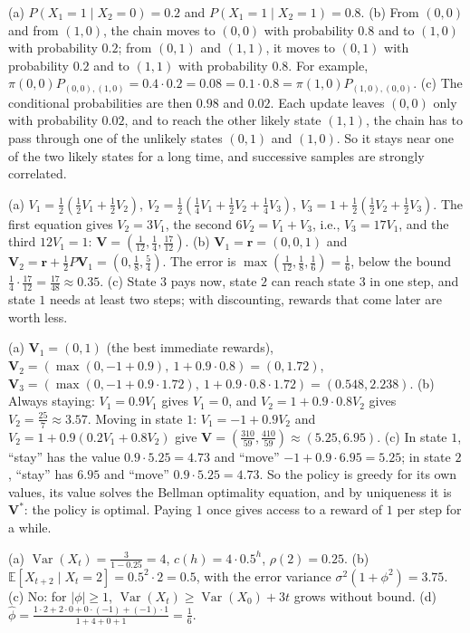 \documentclass[11pt]{article}
\newcommand{\E}{\mathbb{E}}
\DeclareMathOperator{\Var}{Var}
\begin{document}
\begin{description}[leftmargin=0pt, itemsep=0.3em]
    \item[\ref{pr:gibbs-practice}.] (a) $P(X_1 = 1 \mid X_2 = 0) = 0.2$ and $P(X_1 = 1 \mid X_2 = 1) = 0.8$. (b) From $(0, 0)$ and from $(1, 0)$, the chain moves to $(0, 0)$ with probability $0.8$ and to $(1, 0)$ with probability $0.2$; from $(0, 1)$ and $(1, 1)$, it moves to $(0, 1)$ with probability $0.2$ and to $(1, 1)$ with probability $0.8$. For example, $\pi(0, 0)P_{(0,0),(1,0)} = 0.4 \cdot 0.2 = 0.08 = 0.1 \cdot 0.8 = \pi(1, 0)P_{(1,0),(0,0)}$. (c) The conditional probabilities are then $0.98$ and $0.02$. Each update leaves $(0, 0)$ only with probability $0.02$, and to reach the other likely state $(1, 1)$, the chain has to pass through one of the unlikely states $(0, 1)$ and $(1, 0)$. So it stays near one of the two likely states for a long time, and successive samples are strongly correlated.
    \item[\ref{pr:bellman-practice}.] (a) $V_1 = \frac{1}{2}(\frac{1}{2}V_1 + \frac{1}{2}V_2)$, $V_2 = \frac{1}{2}(\frac{1}{4}V_1 + \frac{1}{2}V_2 + \frac{1}{4}V_3)$, $V_3 = 1 + \frac{1}{2}(\frac{1}{2}V_2 + \frac{1}{2}V_3)$. The first equation gives $V_2 = 3V_1$, the second $6V_2 = V_1 + V_3$, i.e., $V_3 = 17V_1$, and the third $12V_1 = 1$: $\mathbf{V} = (\frac{1}{12}, \frac{1}{4}, \frac{17}{12})$. (b) $\mathbf{V}_1 = \mathbf{r} = (0, 0, 1)$ and $\mathbf{V}_2 = \mathbf{r} + \frac{1}{2}P\mathbf{V}_1 = (0, \frac{1}{8}, \frac{5}{4})$. The error is $\max(\frac{1}{12}, \frac{1}{8}, \frac{1}{6}) = \frac{1}{6}$, below the bound $\frac{1}{4} \cdot \frac{17}{12} = \frac{17}{48} \approx 0.35$. (c) State $3$ pays now, state $2$ can reach state $3$ in one step, and state $1$ needs at least two steps; with discounting, rewards that come later are worth less.
    \item[\ref{pr:mdp-practice}.] (a) $\mathbf{V}_1 = (0, 1)$ (the best immediate rewards), $\mathbf{V}_2 = (\max(0, -1 + 0.9), \ 1 + 0.9 \cdot 0.8) = (0, 1.72)$, $\mathbf{V}_3 = (\max(0, -1 + 0.9 \cdot 1.72), \ 1 + 0.9 \cdot 0.8 \cdot 1.72) = (0.548, 2.238)$. (b) Always staying: $V_1 = 0.9V_1$ gives $V_1 = 0$, and $V_2 = 1 + 0.9 \cdot 0.8V_2$ gives $V_2 = \frac{25}{7} \approx 3.57$. Moving in state $1$: $V_1 = -1 + 0.9V_2$ and $V_2 = 1 + 0.9(0.2V_1 + 0.8V_2)$ give $\mathbf{V} = (\frac{310}{59}, \frac{410}{59}) \approx (5.25, 6.95)$. (c) In state $1$, ``stay'' has the value $0.9 \cdot 5.25 = 4.73$ and ``move'' $-1 + 0.9 \cdot 6.95 = 5.25$; in state $2$, ``stay'' has $6.95$ and ``move'' $0.9 \cdot 5.25 = 4.73$. So the policy is greedy for its own values, its value solves the Bellman optimality equation, and by uniqueness it is $\mathbf{V}^*$: the policy is optimal. Paying $1$ once gives access to a reward of $1$ per step for a while.
    \item[\ref{pr:ar1-practice}.] (a) $\Var(X_t) = \frac{3}{1 - 0.25} = 4$, $c(h) = 4 \cdot 0.5^h$, $\rho(2) = 0.25$. (b) $\E[X_{t+2} \mid X_t = 2] = 0.5^2 \cdot 2 = 0.5$, with the error variance $\sigma^2(1 + \phi^2) = 3.75$. (c) No: for $|\phi| \geq 1$, $\Var(X_t) \geq \Var(X_0) + 3t$ grows without bound. (d) $\hat\phi = \frac{1 \cdot 2 + 2 \cdot 0 + 0 \cdot (-1) + (-1) \cdot 1}{1 + 4 + 0 + 1} = \frac{1}{6}$.
\end{description}
\end{document}
